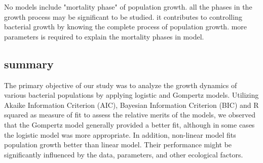 \documentclass[11pt]{article}
\begin{document}
No models include "mortality phase" of  population growth. all the phases in the growth process may be significant to be studied. it contributes to controlling bacterial growth by knowing the complete process of population growth. more parameters is required to explain the mortality phases in model.

\subsection{summary}
The primary objective of our study was to analyze the growth dynamics of various bacterial populations by applying logistic and Gompertz models. Utilizing Akaike Information Criterion (AIC), Bayesian Information Criterion (BIC) and R squared as measure of fit to assess the relative merits of the models, we observed that the Gompertz model generally provided a better fit, although in some cases the logistic model was more appropriate. In addition, non-linear model fits population growth better than linear model. Their performance might be significantly influenced by the data, parameters, and other ecological factors. 

\newpage  

 

\end{document}
